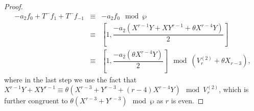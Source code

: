 \documentclass[11pt, reqno]{amsart}
\numberwithin{equation}{section}
\theoremstyle{definition}
\theoremstyle{remark}
\theoremstyle{definition}
\theoremstyle{remark}
\theoremstyle{remark}
\begin{document}
\begin{proof}
\begin{eqnarray}
 -a_{2}f_{0}+ T^{-}f_{1}+ T^{-}f_{-1} &\equiv& -a_2f_0\mod\wp\nonumber\\
 &\equiv & \left[1,\dfrac{-a_{2}(X^{r-1}Y+XY^{r-1}+\theta X^{r-4}Y)}{2} \right] \nonumber\\
 &\equiv& \left[1, \dfrac{-a_{2}(\theta X^{r-4}Y)}{2} \right]\mod (V_{r}^{(2)}+\theta X_{r-3}), \label{sl1F3'rad0}
\end{eqnarray}
 where in the last step we use the fact that $X^{r-1}Y +  XY^{r-1} \equiv \theta (X^{r-3} + Y^{r-3}+ (r-4)X^{r-4}Y)\mod V_r^{(2)}$, which is further congruent to $ \theta (X^{r-3}+Y^{r-3}) \mod \wp$ as $r$ is even.






\end{proof}
\end{document}
